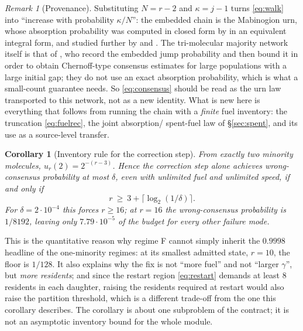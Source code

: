 \documentclass[11pt,a4paper]{article}
\theoremstyle{plain}
\newtheorem{corollary}[theorem]{Corollary}
\theoremstyle{definition}
\theoremstyle{remark}
\newtheorem{remark}[theorem]{Remark}
\begin{document}
\begin{remark}[Provenance]\label{rem:mabinogion}
Substituting $N=r-2$ and $\kappa=j-1$ turns \eqref{eq:walk} into ``increase with
probability $\kappa/N$'': the embedded chain is the Mabinogion urn, whose absorption
probability was computed in closed form by \citet{flajolet2008} in an equivalent integral
form, and studied further by \citet{huillet2009} and \citet{stenlund2018}. The
tri-molecular majority network itself is that of \citet{condon2020}, who record the
embedded jump probability and then bound it in order to obtain Chernoff-type consensus
estimates for large populations with a large initial gap; they do not use an exact
absorption probability, which is what a small-count guarantee needs. So
\eqref{eq:consensus} should be read as the urn law transported to this network, not as a
new identity. What is new here is everything that follows from running the chain with a
\emph{finite} fuel inventory: the truncation \eqref{eq:fuelrec}, the joint absorption/
spent-fuel law of \S\ref{sec:spent}, and its use as a source-level transfer.
\end{remark}

\begin{corollary}[Inventory rule for the correction step]\label{cor:inventory}
From exactly two minority molecules, $u_r(2)=2^{-(r-3)}$. Hence the correction step alone
achieves wrong-consensus probability at most $\delta$, even with unlimited fuel and
unlimited speed, if and only if
\begin{equation}
r\ \ge\ 3+\bigl\lceil\log_2(1/\delta)\bigr\rceil .
\end{equation}
For $\delta=2\cdot10^{-4}$ this forces $r\ge16$; at $r=16$ the wrong-consensus
probability is $1/8192$, leaving only $7.79\cdot10^{-5}$ of the budget for every other
failure mode.
\end{corollary}

This is the quantitative reason why regime F cannot simply inherit the $0.9998$ headline
of the one-minority regimes: at its smallest admitted state, $r=10$, the floor is
$1/128$. It also explains why the fix is not ``more fuel'' and not ``larger $\gamma$'',
but \emph{more residents}; and since the restart region \eqref{eq:restart} demands at
least $8$ residents in each daughter, raising the residents required at restart would
also raise the partition threshold, which is a different trade-off from the one this
corollary describes. The corollary is about one subproblem of the contract; it is not an
asymptotic inventory bound for the whole module.
\end{document}
